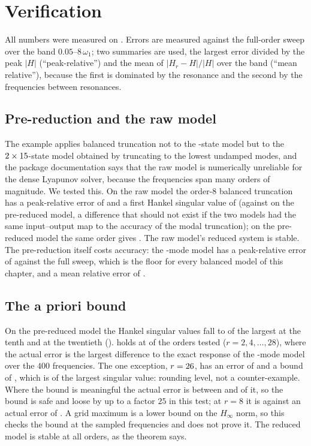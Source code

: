 \section{Verification}\label{sec:bt-verif}

All numbers were measured on \machine{}. Errors are measured against the full-order sweep over the band $0.05$--$8\,\omega_1$; two summaries are used, the largest error divided by the peak $|H|$ (``peak-relative'') and the mean of $|H_r-H|/|H|$ over the band (``mean relative''), because the first is dominated by the resonance and the second by the frequencies between resonances.

\subsection{Pre-reduction and the raw model}\label{sec:bt-raw}

The example applies balanced truncation not to the \cbtNState{}-state model but to the $2\times15$-state model obtained by truncating to the lowest \cbtNPre{} undamped modes, and the package documentation says that the raw model is numerically unreliable for the dense Lyapunov solver, because the frequencies span many orders of magnitude. We tested this. On the raw model the order-8 balanced truncation has a peak-relative error of \cbtRawErrMax and a first Hankel singular value of \cbtRawHsvOne (against \cbtPreHsvOne on the pre-reduced model, a difference that should not exist if the two models had the same input--output map to the accuracy of the modal truncation); on the pre-reduced model the same order gives \cbtBtMaxEight. The raw model's reduced system is stable. The pre-reduction itself costs accuracy: the \cbtNPre{}-mode model has a peak-relative error of \cbtPreErrMax against the full sweep, which is the floor for every balanced model of this chapter, and a mean relative error of \cbtPreErrMean.

\subsection{The a priori bound}

On the pre-reduced model the Hankel singular values fall to \cbtHsvRatioTen of the largest at the tenth and \cbtHsvRatioTwenty at the twentieth ().  holds at \cbtBoundHolds{} of the \cbtBoundCases{} orders tested ($r=2,4,\dots,28$), where the actual error is the largest difference to the exact response of the \cbtNPre{}-mode model over the $400$ frequencies. The one exception, $r=26$, has an error of \cbtMissErr and a bound of \cbtMissBound, which is \cbtMissRel{} of the largest singular value: rounding level, not a counter-example. Where the bound is meaningful the actual error is between \cbtBoundRatioMin{} and \cbtBoundRatioMax{} of it, so the bound is safe and loose by up to a factor $25$ in this test; at $r=8$ it is \cbtBtBoundEight against an actual error of \cbtBtErrIntEight. A grid maximum is a lower bound on the $H_\infty$ norm, so this checks the bound at the sampled frequencies and does not prove it. The reduced model is stable at all \cbtBtStable{} orders, as the theorem says.

